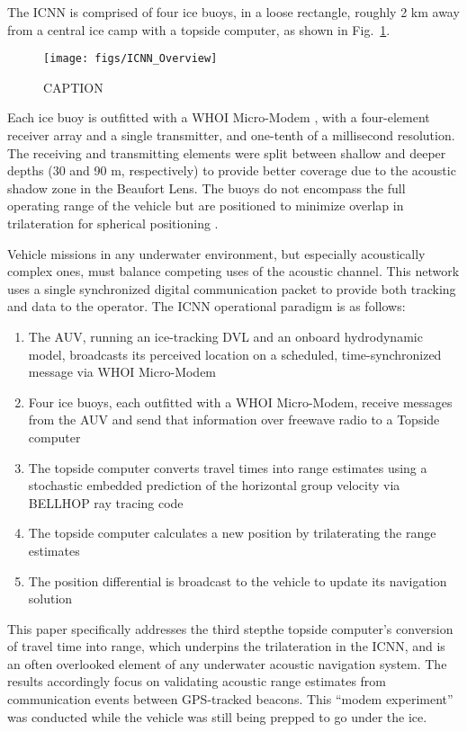 The ICNN is comprised of four ice buoys, in a loose rectangle, roughly 2 km away from a central ice camp with a topside computer, as shown in Fig.~\ref{fig:icnnOverview}.

\begin{figure}[h!]
	\centering
	\texttt{[image: figs/ICNN\_Overview]}
	\label{fig:icnnOverview}
	\caption{CAPTION}
\end{figure}

Each ice buoy is outfitted with a WHOI Micro-Modem \citep{singh_underwater_2006}, with a four-element receiver array and a single transmitter, and one-tenth of a millisecond resolution.
The receiving and transmitting elements were split between shallow and deeper depths (30 and 90 m, respectively) to provide better coverage due to the acoustic shadow zone in the Beaufort Lens.
The buoys do not encompass the full operating range of the vehicle but are positioned to minimize overlap in trilateration for spherical positioning \citep{deffenbaugh_relationship_1996}.

Vehicle missions in any underwater environment, but especially acoustically complex ones, must balance competing uses of the acoustic channel.
This network uses a single synchronized digital communication packet to provide both tracking and data to the operator.
The ICNN operational paradigm is as follows:
\begin{enumerate}
\item The AUV, running an ice-tracking DVL and an onboard hydrodynamic model, broadcasts its perceived location on a scheduled, time-synchronized message via WHOI Micro-Modem
\item Four ice buoys, each outfitted with a WHOI Micro-Modem, receive messages from the AUV and send that information over freewave radio to a Topside computer
\item The topside computer converts travel times into range estimates using a stochastic embedded prediction of the horizontal group velocity via BELLHOP ray tracing code \citep{porter_bellhop_2011}
\item The topside computer calculates a new position by trilaterating the range estimates
\item The position differential is broadcast to the vehicle to update its navigation solution
\end{enumerate}

This paper specifically addresses the third step\textemdash the topside computer's conversion of travel time into range, which underpins the trilateration in the ICNN, and is an often overlooked element of any underwater acoustic navigation system.
The results accordingly focus on validating acoustic range estimates from communication events between GPS-tracked beacons.
This ``modem experiment'' was conducted while the vehicle was still being prepped to go under the ice.

